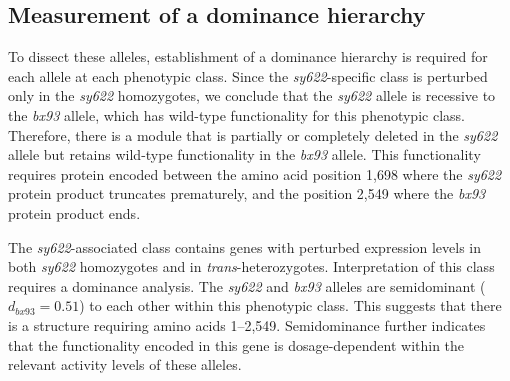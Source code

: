 \documentclass[10pt, twocolumn]{article}
\begin{document}
\subsection*{Measurement of a dominance hierarchy}

To dissect these alleles, establishment of a dominance hierarchy is required for
each allele at each phenotypic class. Since the \emph{sy622}-specific class is
perturbed only in the \emph{sy622} homozygotes, we conclude that the
\emph{sy622} allele is recessive to the \emph{bx93} allele, which has wild-type
functionality for this phenotypic class. Therefore, there is a  module that is
partially or completely deleted in the \emph{sy622} allele but  retains
wild-type functionality in the \emph{bx93} allele. This functionality requires
protein encoded between the amino acid position 1,698 where the \emph{sy622}
protein product truncates prematurely, and the position 2,549 where the
\emph{bx93} protein product ends.

The \emph{sy622}-associated class contains genes with perturbed expression
levels in both \emph{sy622} homozygotes and in \emph{trans}-heterozygotes.
Interpretation of this class requires a dominance analysis. The \emph{sy622} and
\emph{bx93} alleles are semidominant ($d_{bx93} = 0.51$) to each other within
this phenotypic class. This suggests that there is a structure requiring amino
acids 1--2,549. Semidominance further indicates that the functionality encoded
in this gene is dosage-dependent within the relevant activity levels of these
alleles.
\end{document}
